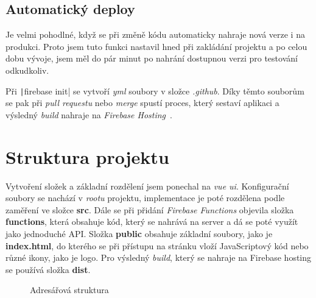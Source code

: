 \subsection{Automatický deploy}
Je velmi pohodlné, když se při změně kódu automaticky nahraje nová verze i na produkci. Proto jsem tuto funkci nastavil hned
při zakládání projektu a po celou dobu vývoje, jsem měl do pár minut po nahrání dostupnou verzi pro testování odkudkoliv.

Při \texttt|firebase init| se vytvoří \emph{yml} soubory v složce \emph{.github}. Díky těmto souborům se pak při
\emph{pull requestu} nebo \emph{merge} spustí proces, který sestaví aplikaci a výsledný \emph{build} nahraje na \emph{Firebase Hosting}~\cite{FirebaseHosting}.

\section{Struktura projektu}
Vytvoření složek a základní rozdělení jsem ponechal na \emph{vue ui}. Konfigurační soubory se nachází v \emph{rootu} projektu, implementace
je poté rozdělena podle zaměření ve složce \textbf{src}. Dále se při přidání \emph{Firebase Functions} objevila složka \textbf{functions}, která
obsahuje kód, který se nahrává na server a dá se poté využít jako jednoduché API. Složka \textbf{public} obsahuje základní soubory, jako je \textbf{index.html},
do kterého se při přístupu na stránku vloží JavaScriptový kód nebo různé ikony, jako je logo. Pro výsledný \emph{build}, který se nahraje na Firebase hosting se
používá složka \textbf{dist}.

\begin{figure}
    \caption{Adresářová struktura} \label{fig:struktura}
\end{figure}


